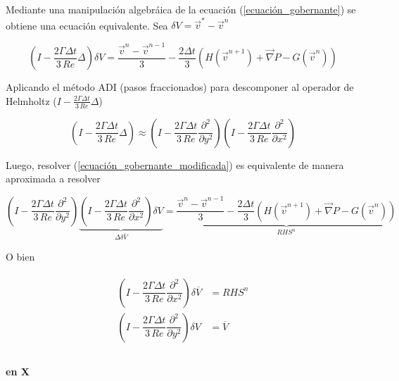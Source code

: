 Mediante una manipulación algebráica de la ecuación (\ref{ecuación_gobernante}) se obtiene una ecuación equivalente. Sea $\delta V = \vec{v}^* - \vec{v}^n $

\begin{equation} \label{ecuación_gobernante_modificada}
\left( I - \dfrac{2 \Gamma \Delta t}{3 \, Re} \Delta \right) \delta V = \dfrac{\vec{v}^n-\vec{v}^{n-1}}{3} - \dfrac{2 \Delta t}{3} \left( H(\vec{v}^{n+1}) + \vec{\nabla} P - G(\vec{v}^n) \right)
\end{equation} 

Aplicando el método ADI (pasos fraccionados) para descomponer al operador de Helmholtz ($I - \frac{2 \Gamma \Delta t}{3 \, Re} \Delta $)

\begin{equation}
\left( I - \dfrac{2 \Gamma \Delta t}{3 \, Re} \Delta \right) \approx \left( I - \dfrac{2 \Gamma \Delta t}{3 \, Re} \dfrac{\partial^2}{\partial y^2} \right) \left( I - \dfrac{2 \Gamma \Delta t}{3 \, Re} \dfrac{\partial^2}{\partial x^2} \right)
\end{equation}

Luego, resolver (\ref{ecuación_gobernante_modificada}) es equivalente de manera aproximada a resolver

\begin{equation}
\left( I - \dfrac{2 \Gamma \Delta t}{3 \, Re} \dfrac{\partial^2}{\partial y^2} \right) \underbrace{ \left( I - \dfrac{2 \Gamma \Delta t}{3 \, Re} \dfrac{\partial^2}{\partial x^2} \right) \delta V }_{\Delta \delta \overline{V}} = \underbrace{ \dfrac{\vec{v}^n-\vec{v}^{n-1}}{3} - \dfrac{2 \Delta t}{3} \left( H(\vec{v}^{n+1}) + \vec{\nabla} P - G(\vec{v}^n) \right) }_{RHS^n} 
\end{equation}

O bien

\begin{align}
\begin{split}
\left( I - \dfrac{2 \Gamma \Delta t}{3 \, Re} \dfrac{\partial^2}{\partial x^2} \right) \delta \overline{V} &= RHS^n \\ 
\left( I - \dfrac{2 \Gamma \Delta t}{3 \, Re} \dfrac{\partial^2}{\partial y^2} \right) \delta V &= \overline{V} \\  
\end{split}
\end{align}

\paragraph{en X}

